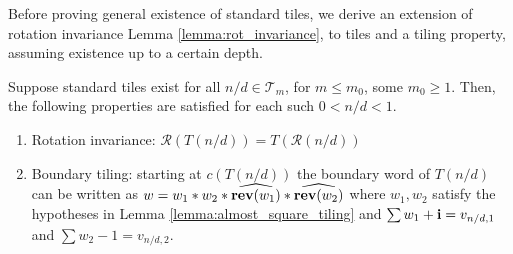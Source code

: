\documentclass[12pt]{amsart}
\begin{document}
Before proving general existence of standard tiles, we derive an extension of rotation invariance Lemma \ref{lemma:rot_invariance}, to tiles
and a tiling property, assuming existence up to a certain depth. 
\begin{lemma}\label{lemma:standard_boundary_word_recursion}
	Suppose standard tiles exist for all $n/d \in \mathcal{T}_m$, for $m \leq m_0$, some $m_0 \geq 1$. 
	Then, the following properties are satisfied for each such $0 < n/d < 1$.
	\begin{enumerate}
		\item Rotation invariance:  $\mathcal{R}(T(n/d)) = T(\mathcal{R}(n/d))$
		\item Boundary tiling: starting at $c(T(n/d))$ the boundary word of $T(n/d)$ can be written as $w = w_1 * w_2 * \widehat{\mathop{\bf rev}(w_1)} * \widehat{\mathop{\bf rev}(w_2)}$ where $w_1,w_2$ satisfy the hypotheses in Lemma \ref{lemma:almost_square_tiling} 
		and $\sum w_1 + \mathbf{i} =  v_{n/d, 1}$ and $\sum w_2 -1= v_{n/d,2}$.
	\end{enumerate}
\end{lemma} 

%
%
\end{document}
